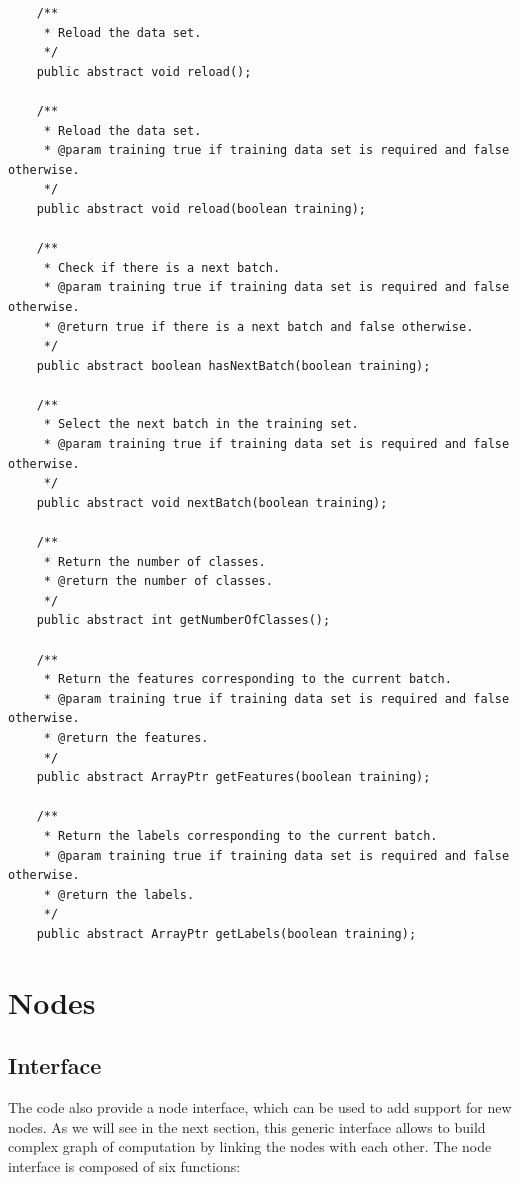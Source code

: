 \documentclass[11pt]{report}
\begin{document}
\begin{verbatim}
    /**
     * Reload the data set.
     */
    public abstract void reload();

    /**
     * Reload the data set.
     * @param training true if training data set is required and false otherwise.
     */
    public abstract void reload(boolean training);

    /**
     * Check if there is a next batch.
     * @param training true if training data set is required and false otherwise.
     * @return true if there is a next batch and false otherwise.
     */
    public abstract boolean hasNextBatch(boolean training);

    /**
     * Select the next batch in the training set.
     * @param training true if training data set is required and false otherwise.
     */
    public abstract void nextBatch(boolean training);

    /**
     * Return the number of classes.
     * @return the number of classes.
     */
    public abstract int getNumberOfClasses();

    /**
     * Return the features corresponding to the current batch.
     * @param training true if training data set is required and false otherwise.
     * @return the features.
     */
    public abstract ArrayPtr getFeatures(boolean training);

    /**
     * Return the labels corresponding to the current batch.
     * @param training true if training data set is required and false otherwise.
     * @return the labels.
     */
    public abstract ArrayPtr getLabels(boolean training);
\end{verbatim}

\section{Nodes} \label{sec:nodes}

\subsection{Interface}

The code also provide a node interface, which can be used to add support for new nodes. As we will see in the next section, this generic interface allows to build complex graph of computation by linking the nodes with each other. The node interface is composed of six functions:
\end{document}
